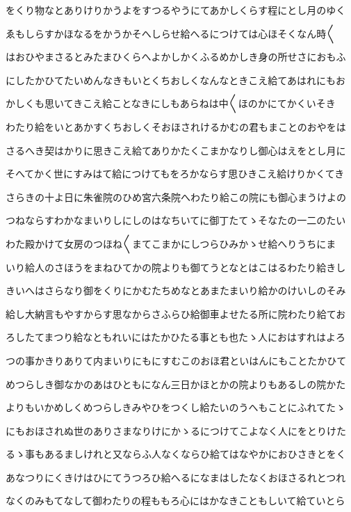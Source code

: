 \documentclass[a4paper,11pt,landscape]{ltjtarticle}
\begin{document}
をくり物なとありけりかうよをすつるやうにてあかしくらす程にとし月のゆく
\par\medskip
ゑもしらすかほなるをかうかそへしらせ給へるにつけては心ほそくなん時〱
\par\medskip
はおひやまさるとみたまひくらへよかしかくふるめかしき身の所せさにおもふ
\par\medskip
にしたかひてたいめんなきもいとくちおしくなんなときこえ給てあはれにもお
\par\medskip
かしくも思いてきこえ給ことなきにしもあらねは中〱ほのかにてかくいそき
\par\medskip
わたり給をいとあかすくちおしくそおほされけるかむの君もまことのおやをは
\par\medskip
さるへき契はかりに思きこえ給てありかたくこまかなりし御心はえをとし月に
\par\medskip
そへてかく世にすみはて給につけてもをろかならす思ひきこえ給けりかくてき
\par\medskip
さらきの十よ日に朱雀院のひめ宮六条院へわたり給この院にも御心まうけよの
\par\medskip
つねならすわかなまいりしにしのはなちいてに御丁たてゝそなたの一二のたい
\par\medskip
わた殿かけて女房のつほね〱まてこまかにしつらひみかゝせ給へりうちにま
\par\medskip
いり給人のさほうをまねひてかの院よりも御てうとなとはこはるわたり給きし
\par\medskip
きいへはさらなり御をくりにかむたちめなとあまたまいり給かのけいしのそみ
\par\medskip
給し大納言もやすからす思なからさふらひ給御車よせたる所に院わたり給てお
\par\medskip
ろしたてまつり給なともれいにはたかひたる事とも也たゝ人におはすれはよろ
\par\medskip
つの事かきりありて内まいりにもにすむこのおほ君といはんにもことたかひて
\par\medskip
めつらしき御なかのあはひともになん三日かほとかの院よりもあるしの院かた
\par\medskip
よりもいかめしくめつらしきみやひをつくし給たいのうへもことにふれてたゝ
\par\medskip
にもおほされぬ世のありさまなりけにかゝるにつけてこよなく人にをとりけた
\par\medskip
るゝ事もあるましけれと又ならふ人なくならひ給てはなやかにおひさきとをく
\par\medskip
あなつりにくきけはひにてうつろひ給へるになまはしたなくおほさるれとつれ
\par\medskip
なくのみもてなして御わたりの程ももろ心にはかなきこともしいて給ていとら
\end{document}
